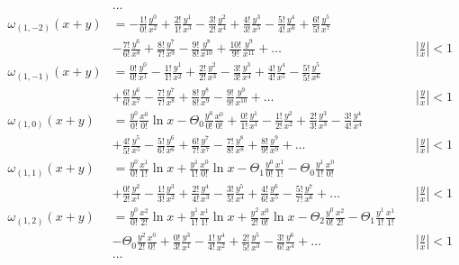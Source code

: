 \begin{equation*} \begin{aligned}
&\ldots \\
%
\omega_{(1,-2)}(x + y) &= 
- \frac{1!}{0!} \frac{y^0}{x^2}
+ \frac{2!}{1!} \frac{y^1}{x^3}
- \frac{3!}{2!} \frac{y^2}{x^4}
+ \frac{4!}{3!} \frac{y^3}{x^5}
- \frac{5!}{4!} \frac{y^4}{x^6}
+ \frac{6!}{5!} \frac{y^5}{x^7} \\ &
- \frac{7!}{6!} \frac{y^6}{x^8}
+ \frac{8!}{7!} \frac{y^7}{x^9}
- \frac{9!}{8!} \frac{y^8}{x^{10}}
+ \frac{10!}{9!} \frac{y^9}{x^{11}}
+ \ldots & 
&\left| \frac{y}{x} \right| < 1 \\
%
\omega_{(1,-1)}(x + y) &=  
  \frac{0!}{0!} \frac{y^0}{x^1}
- \frac{1!}{1!} \frac{y^1}{x^2}
+ \frac{2!}{2!} \frac{y^2}{x^3}
- \frac{3!}{3!} \frac{y^3}{x^4}
+ \frac{4!}{4!} \frac{y^4}{x^5}
- \frac{5!}{5!} \frac{y^5}{x^6} \\ &
+ \frac{6!}{6!} \frac{y^6}{x^7}
- \frac{7!}{7!} \frac{y^7}{x^8}
+ \frac{8!}{8!} \frac{y^8}{x^9}
- \frac{9!}{9!} \frac{y^9}{x^{10}}
+ \ldots & 
&\left| \frac{y}{x} \right| < 1 \\
%
\omega_{(1,0)}(x + y) &=
  \frac{y^0}{0!} \frac{x^0}{0!} \ln{x}
- \Theta_0 \frac{y^0}{0!} \frac{x^0}{0!}
+ \frac{0!}{1!} \frac{y^1}{x^1} 
- \frac{1!}{2!} \frac{y^2}{x^2}
+ \frac{2!}{3!} \frac{y^3}{x^3}
- \frac{3!}{4!} \frac{y^4}{x^4} \\ &
+ \frac{4!}{5!} \frac{y^5}{x^5}
- \frac{5!}{6!} \frac{y^6}{x^6}
+ \frac{6!}{7!} \frac{y^7}{x^7}
- \frac{7!}{8!} \frac{y^8}{x^8}
+ \frac{8!}{9!} \frac{y^9}{x^9}
+ \ldots & 
&\left| \frac{y}{x} \right| < 1 \\
%
\omega_{(1,1)}(x + y) &=
  \frac{y^0}{0!} \frac{x^1}{1!} \ln{x}
+ \frac{y^1}{1!} \frac{x^0}{0!} \ln{x}
- \Theta_1 \frac{y^0}{0!} \frac{x^1}{1!}
- \Theta_0 \frac{y^1}{1!} \frac{x^0}{0!} \\ &
+ \frac{0!}{2!} \frac{y^2}{x^1}
- \frac{1!}{3!} \frac{y^3}{x^2}
+ \frac{2!}{4!} \frac{y^4}{x^3}
- \frac{3!}{5!} \frac{y^5}{x^4}
+ \frac{4!}{6!} \frac{y^6}{x^5}
- \frac{5!}{7!} \frac{y^7}{x^6}
+ \ldots & 
&\left| \frac{y}{x} \right| < 1 \\
%
\omega_{(1,2)}(x + y) &=
  \frac{y^0}{0!} \frac{x^2}{2!} \ln{x}
+ \frac{y^1}{1!} \frac{x^1}{1!} \ln{x}
+ \frac{y^2}{2!} \frac{x^0}{0!} \ln{x}
- \Theta_2 \frac{y^0}{0!} \frac{x^2}{2!}
- \Theta_1 \frac{y^1}{1!} \frac{x^1}{1!} \\ &
- \Theta_0 \frac{y^2}{2!} \frac{x^0}{0!}
+ \frac{0!}{3!} \frac{y^3}{x^1}
- \frac{1!}{4!} \frac{y^4}{x^2}
+ \frac{2!}{5!} \frac{y^5}{x^3}
- \frac{3!}{6!} \frac{y^6}{x^4}
+ \ldots & 
&\left| \frac{y}{x} \right| < 1 \\
%
&\ldots \\
\end{aligned} \end{equation*}
